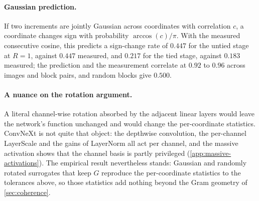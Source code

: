 \begin{table}[t]
    \centering
    \caption{Per-coordinate statistics of stage~3 at integer times ($R{=}100$, $500$
    images, massive channel removed) for the real increments and for Gaussian
    increments with the same Gram matrix (mean over three seeds; std $\le 0.001$).}
    \label{tab:app-per-coordinate}
    \scriptsize
    \setlength{\tabcolsep}{2.5pt}
\end{table}

\paragraph{Gaussian prediction.}
If two increments are jointly Gaussian across coordinates with correlation $c$, a
coordinate changes sign with probability $\arccos(c)/\pi$.
With the measured consecutive cosine, this predicts a sign-change rate of $0.447$ for
the untied stage at $R{=}1$, against $0.447$ measured, and $0.217$ for the tied stage,
against $0.183$ measured; the prediction and the measurement correlate at $0.92$ to
$0.96$ across images and block pairs, and random blocks give $0.500$.

\paragraph{A nuance on the rotation argument.}
A literal channel-wise rotation absorbed by the adjacent linear layers would leave the
network's function unchanged and would change the per-coordinate statistics.
ConvNeXt is not quite that object: the depthwise convolution, the per-channel
LayerScale and the gains of LayerNorm all act per channel, and the massive activation
shows that the channel basis is partly privileged
(\cref{app:massive-activations}).
The empirical result nevertheless stands: Gaussian and randomly rotated surrogates that
keep $G$ reproduce the per-coordinate statistics to the tolerances above, so those
statistics add nothing beyond the Gram geometry of \cref{sec:coherence}.

